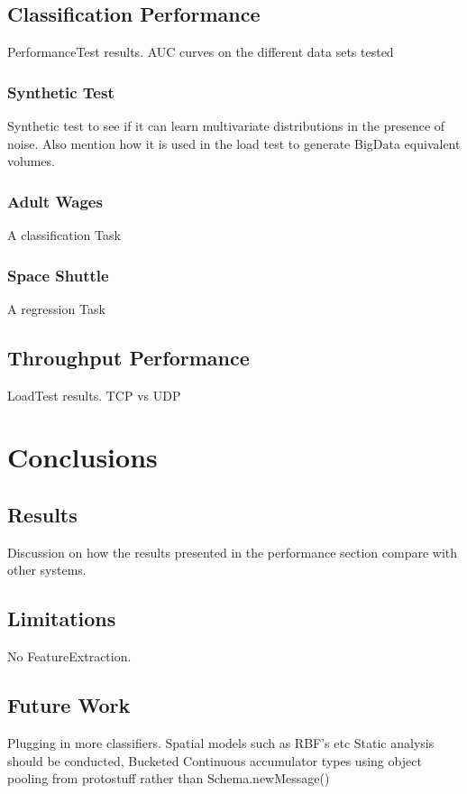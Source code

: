 \documentclass[a4paper,11pt]{scrreprt}
\begin{document}
\section{Classification Performance}
PerformanceTest results. AUC curves on the different data sets tested
\subsection{Synthetic Test}
Synthetic test to see if it can learn multivariate distributions in the presence of noise. Also mention how it is used in the load test to generate BigData equivalent volumes.
\subsection{Adult Wages}
A classification Task
\subsection{Space Shuttle}
A regression Task
\section{Throughput Performance}
LoadTest results. TCP vs UDP
\chapter{Conclusions}
\section{Results}
Discussion on how the results presented in the performance section compare with other systems.
\section{Limitations}
No FeatureExtraction.
\section{Future Work}
Plugging in more classifiers. Spatial models such as RBF's etc
Static analysis should be conducted,
Bucketed Continuous accumulator types
using object pooling from protostuff rather than Schema.newMessage()

\printbibliography
\end{document}
